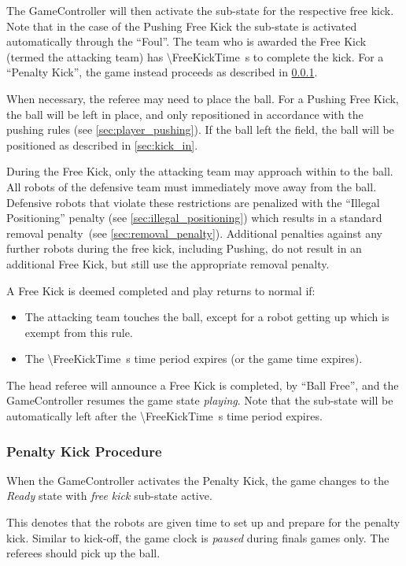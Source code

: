 The GameController will then activate the sub-state for the respective free kick. Note that in the case of the Pushing Free Kick the sub-state is activated automatically through the ``Foul''.
The team who is awarded the Free Kick (termed the attacking team) has \qty{\FreeKickTime}{\second} to complete the kick.
For a ``Penalty Kick'', the game instead proceeds as described in \cref{sec:penalty_free_kick}.

When necessary, the referee may need to place the ball.
For a Pushing Free Kick, the ball will be left in place, and only repositioned in accordance with the pushing rules (see \cref{sec:player_pushing}).
If the ball left the field, the ball will be positioned as described in \cref{sec:kick_in}.

During the Free Kick, only the attacking team may approach within \FreeKickRadius to the ball. All robots of the defensive team must immediately move away from the ball. Defensive robots that violate these restrictions are penalized with the ``Illegal Positioning'' penalty (see \cref{sec:illegal_positioning}) which results in a standard removal penalty~(see \cref{sec:removal_penalty}).
Additional penalties against any further robots during the free kick, including Pushing, do not result in an additional Free Kick, but still use the appropriate removal penalty.

A Free Kick is deemed completed and play returns to normal if:
\begin{itemize}
    \item The attacking team touches the ball, except for a robot getting up which is exempt from this rule.
    \item The \qty{\FreeKickTime}{\second} time period expires (or the game time expires).
\end{itemize}
The head referee will announce a Free Kick is completed, by ``Ball Free'', and the GameController resumes the game state \emph{playing}. Note that the sub-state will be automatically left after the \qty{\FreeKickTime}{\second} time period expires.

\subsubsection{Penalty Kick Procedure}
\label{sec:penalty_free_kick}

When the GameController activates the Penalty Kick, the game changes to the \textit{Ready} state with \textit{free kick} sub-state active.

This denotes that the robots are given time to set up and prepare for the penalty kick.
Similar to kick-off, the game clock is \textit{paused} during finals games only.
The referees should pick up the ball.

